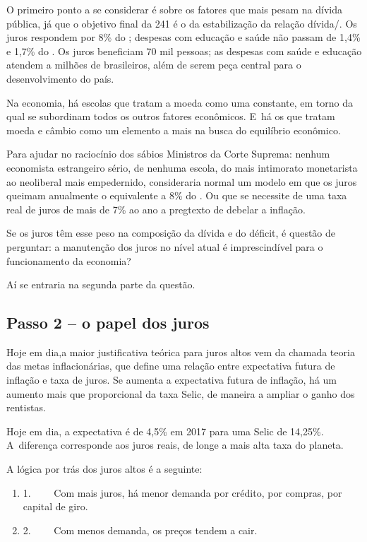 O primeiro ponto a se considerar é sobre os fatores que mais pesam na
dívida pública, já que o objetivo final da  241 é o da estabilização
da relação dívida/\allowbreak{}. Os juros respondem por 8\% do ; despesas com
educação e saúde não passam de 1,4\% e 1,7\% do . Os juros beneficiam
70 mil pessoas; as despesas com saúde e educação atendem a milhões de
brasileiros, além de serem peça central para o desenvolvimento do país.

Na economia, há escolas que tratam a moeda como uma constante, em torno
da qual se subordinam todos os outros fatores econômicos. E~há os que
tratam moeda e câmbio como um elemento a mais na busca do equilíbrio
econômico.

Para ajudar no raciocínio dos sábios Ministros da Corte Suprema: nenhum
economista estrangeiro sério, de nenhuma escola, do mais intimorato
monetarista ao neoliberal mais empedernido, consideraria normal um
modelo em que os juros queimam anualmente o equivalente a 8\% do . Ou
que se necessite de uma taxa real de juros de mais de 7\% ao ano a
pregtexto de debelar a inflação.

Se os juros têm esse peso na composição da dívida e do déficit, é
questão de perguntar: a manutenção dos juros no nível atual é
imprescindível para o funcionamento da economia?

Aí se entraria na segunda parte da questão.

\subsection{Passo 2 -- o papel dos juros}

Hoje em dia,a maior justificativa teórica para juros altos vem da
chamada teoria das metas inflacionárias, que define uma relação entre
expectativa futura de inflação e taxa de juros. Se aumenta a expectativa
futura de inflação, há um aumento mais que proporcional da taxa Selic,
de maneira a ampliar o ganho dos rentistas.

Hoje em dia, a expectativa é de 4,5\% em 2017 para uma Selic de 14,25\%.
A~diferença corresponde aos juros reais, de longe a mais alta taxa do
planeta.

A lógica por trás dos juros altos é a seguinte:

\begin{enumerate}
\itemsep1pt\parskip0pt
\item
  1.~~~~ Com mais juros, há menor demanda por crédito, por compras, por
  capital de giro.
\item
  2.~~~~ Com menos demanda, os preços tendem a cair.
\end{enumerate}

